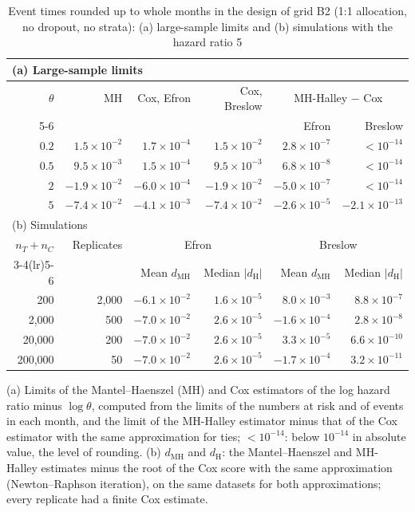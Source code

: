 \begin{table}
\caption{Event times rounded up to whole months in the design of grid B2 (1:1 allocation, no dropout, no strata): (a) large-sample limits and (b) simulations with the hazard ratio 5}
\label{tab:grouped}
\centering
\footnotesize
\begin{tabular}{rrrrrr}
\toprule
\multicolumn{6}{l}{(a) Large-sample limits} \\
\midrule
$\theta$ & MH & Cox, Efron & Cox, Breslow & \multicolumn{2}{c}{MH-Halley $-$ Cox} \\
\cmidrule(lr){5-6}
 & & & & Efron & Breslow \\
\midrule
$0.2$ & $1.5 \times 10^{-2}$ & $1.7 \times 10^{-4}$ & $1.5 \times 10^{-2}$ & $2.8 \times 10^{-7}$ & $< 10^{-14}$ \\
$0.5$ & $9.5 \times 10^{-3}$ & $1.5 \times 10^{-4}$ & $9.5 \times 10^{-3}$ & $6.8 \times 10^{-8}$ & $< 10^{-14}$ \\
$2$ & $-1.9 \times 10^{-2}$ & $-6.0 \times 10^{-4}$ & $-1.9 \times 10^{-2}$ & $-5.0 \times 10^{-7}$ & $< 10^{-14}$ \\
$5$ & $-7.4 \times 10^{-2}$ & $-4.1 \times 10^{-3}$ & $-7.4 \times 10^{-2}$ & $-2.6 \times 10^{-5}$ & $-2.1 \times 10^{-13}$ \\
\midrule
\multicolumn{6}{l}{(b) Simulations} \\
\midrule
$n_T + n_C$ & Replicates & \multicolumn{2}{c}{Efron} & \multicolumn{2}{c}{Breslow} \\
\cmidrule(lr){3-4}\cmidrule(lr){5-6}
 & & Mean $d_{\mathrm{MH}}$ & Median $|d_{\mathrm{H}}|$ & Mean $d_{\mathrm{MH}}$ & Median $|d_{\mathrm{H}}|$ \\
\midrule
200 & 2,000 & $-6.1 \times 10^{-2}$ & $1.6 \times 10^{-5}$ & $8.0 \times 10^{-3}$ & $8.8 \times 10^{-7}$ \\
2,000 & 500 & $-7.0 \times 10^{-2}$ & $2.6 \times 10^{-5}$ & $-1.6 \times 10^{-4}$ & $2.8 \times 10^{-8}$ \\
20,000 & 200 & $-7.0 \times 10^{-2}$ & $2.6 \times 10^{-5}$ & $3.3 \times 10^{-5}$ & $6.6 \times 10^{-10}$ \\
200,000 & 50 & $-7.0 \times 10^{-2}$ & $2.6 \times 10^{-5}$ & $-1.7 \times 10^{-4}$ & $3.2 \times 10^{-11}$ \\
\bottomrule
\end{tabular}
\par\smallskip
{\footnotesize (a) Limits of the Mantel--Haenszel (MH) and Cox estimators of the log hazard ratio minus $\log \theta$, computed from the limits of the numbers at risk and of events in each month, and the limit of the MH-Halley estimator minus that of the Cox estimator with the same approximation for ties; $< 10^{-14}$: below $10^{-14}$ in absolute value, the level of rounding. (b) $d_{\mathrm{MH}}$ and $d_{\mathrm{H}}$: the Mantel--Haenszel and MH-Halley estimates minus the root of the Cox score with the same approximation (Newton--Raphson iteration), on the same datasets for both approximations; every replicate had a finite Cox estimate.\par}
\end{table}
